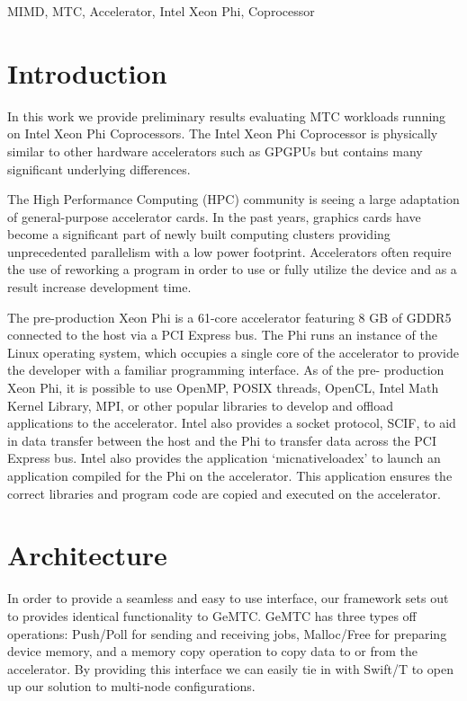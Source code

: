 \documentclass[conference]{IEEEtran}
\begin{document}
\begin{IEEEkeywords}
MIMD, MTC, Accelerator, Intel Xeon Phi, Coprocessor
\end{IEEEkeywords}

\IEEEpeerreviewmaketitle

\section{Introduction}
In this work we provide preliminary results evaluating MTC workloads running on Intel Xeon Phi Coprocessors. The Intel Xeon Phi Coprocessor is physically similar to other hardware accelerators such as GPGPUs but contains many significant underlying differences.

The High Performance Computing (HPC) community is seeing a large adaptation of general-purpose accelerator cards. In the past years, graphics cards have become a significant part of newly built computing clusters providing unprecedented parallelism with a low power footprint. Accelerators often require the use of reworking a program in order to use or fully utilize the device and as a result increase development time.

The pre-production Xeon Phi is a 61-core accelerator featuring 8 GB of GDDR5 connected to the host via a PCI Express bus. The Phi runs an instance of the Linux operating system, which occupies a single core of the accelerator to provide the developer with a familiar programming interface. As of the pre- production Xeon Phi, it is possible to use OpenMP, POSIX threads, OpenCL, Intel Math Kernel Library, MPI, or other popular libraries to develop and offload applications to the accelerator. Intel also provides a socket protocol, SCIF, to aid in data transfer between the host and the Phi to transfer data across the PCI Express bus. Intel also provides the application ‘micnativeloadex’ to launch an application compiled for the Phi on the accelerator. This application ensures the correct libraries and program code are copied and executed on the accelerator.

\section{Architecture}
In order to provide a seamless and easy to use interface, our framework sets out to provides identical functionality to GeMTC. \cite{kriederSC12} GeMTC has three types off operations: Push/Poll for sending and receiving jobs, Malloc/Free for preparing device memory, and a memory copy operation to copy data to or from the accelerator. \cite{grimmerEUROSYS13} By providing this interface we can easily tie in with Swift/T \cite{wozniak13swift} to open up our solution to multi-node configurations.
\end{document}
